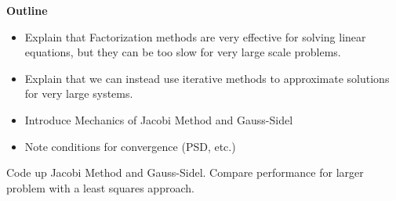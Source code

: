 

{\bf Outline}
\begin{itemize}
\item Explain that Factorization methods are very effective for solving linear equations, but they can be too slow for very large scale problems.
\item Explain that we can instead use iterative methods to approximate solutions for very large systems.
\item Introduce Mechanics of Jacobi Method and Gauss-Sidel
\item Note conditions for convergence (PSD, etc.)
\end{itemize}

\begin{problem}
Code up Jacobi Method and Gauss-Sidel. Compare performance for larger problem with a least squares approach.
\end{problem}